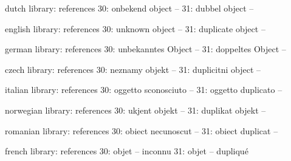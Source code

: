 

\unprotect

\startmessages  dutch  library: references
     30: onbekend object --
     31: dubbel object --
\stopmessages

\startmessages  english  library: references
     30: unknown object --
     31: duplicate object --
\stopmessages

\startmessages  german  library: references
     30: unbekanntes Object --
     31: doppeltes Object --
\stopmessages

\startmessages  czech  library: references
     30: neznamy objekt --
     31: duplicitni object --
\stopmessages

\startmessages  italian  library: references
     30: oggetto sconosciuto --
     31: oggetto duplicato --
\stopmessages

\startmessages  norwegian  library: references
     30: ukjent objekt --
     31: duplikat objekt --
\stopmessages

\startmessages  romanian  library: references
     30: obiect necunoscut --
     31: obiect duplicat --
\stopmessages

\startmessages  french  library: references
     30: objet -- inconnu
     31: objet -- dupliqué
\stopmessages


